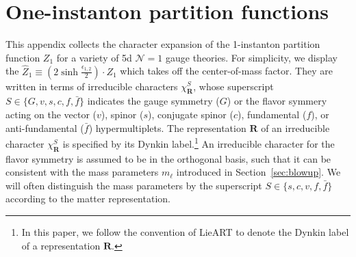 \documentclass[letterpaper, 11pt]{article}
\def\e{\epsilon}
\begin{document}
{%

\appendix
\section{One-instanton partition functions}
\label{sec:data}

This appendix collects the character expansion of the 1-instanton partition function $Z_1$ for a variety of 5d $\mathcal{N}=1$ gauge theories. For simplicity, we display the $\hat{Z}_1 \equiv (2\sinh{\frac{\e_{1,2}}{2}}) \cdot Z_1$ which takes off the center-of-mass factor. They are written in terms of irreducible characters $\chi_{\mathbf{R}}^S$, whose superscript $S \in \{G,v,s,c,f,\bar{f}\}$ indicates the gauge symmetry ($G$) or the flavor symmery acting on the vector ($v$), spinor ($s$), conjugate spinor ($c$), fundamental ($f$), or anti-fundamental ($\bar{f}$) hypermultiplets. The representation $\mathbf{R}$ of an irreducible character $\chi_{\mathbf{R}}^S$ is specified by its Dynkin label.\footnote{In this paper, we follow the convention of  LieART \cite{Feger:2012bs} to denote the Dynkin label of a representation $\mathbf{R}$.} An irreducible character for the flavor symmetry is assumed to be in the orthogonal basis, such that it can be consistent with the mass parameters $m_\ell$ introduced in Section~\ref{sec:blowup}. We will often distinguish the mass parameters by the superscript $S \in \{s,c,v,f,\bar{f}\}$ according to the matter representation. 

}
\end{document}
